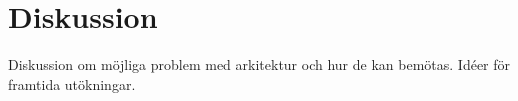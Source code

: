 \section{Diskussion}
Diskussion om möjliga problem med arkitektur och hur de kan bemötas. Idéer för framtida utökningar.